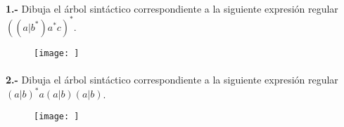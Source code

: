 \documentclass[11pt,a4paper]{report}
\begin{document}
\paragraph{}

\paragraph{}
\textbf{1.-} Dibuja el árbol sintáctico correspondiente a la siguiente expresión regular $ ((a|b^*)a^*c)^* $. 
\begin{figure}[ht!]
\centering
\texttt{[image: ]}
\end{figure}\paragraph{}
\textbf{2.-} Dibuja el árbol sintáctico correspondiente a la siguiente expresión regular $ (a|b)^*a(a|b)(a|b) $. 
\begin{figure}[ht!]
\centering
\texttt{[image: ]}
\end{figure}
\end{document}
